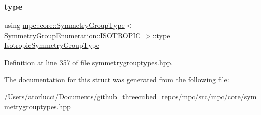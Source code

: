 \subsubsection{\texorpdfstring{type}{type}}
{\footnotesize\ttfamily using \mbox{\hyperlink{structmpc_1_1core_1_1_symmetry_group_type}{mpc\+::core\+::\+Symmetry\+Group\+Type}}$<$ \mbox{\hyperlink{namespacempc_1_1core_a9d979684062547055a0ef5c13077bad8a099d59049574174a1c19567d38b479c2}{Symmetry\+Group\+Enumeration\+::\+I\+S\+O\+T\+R\+O\+P\+IC}} $>$\+::\mbox{\hyperlink{structmpc_1_1core_1_1_symmetry_group_type_3_01_symmetry_group_enumeration_1_1_i_s_o_t_r_o_p_i_c_01_4_a8f392bfab082bbb0e49b422b3601e73a}{type}} =  \mbox{\hyperlink{structmpc_1_1core_1_1_isotropic_symmetry_group_type}{Isotropic\+Symmetry\+Group\+Type}}}



Definition at line 357 of file symmetrygrouptypes.\+hpp.



The documentation for this struct was generated from the following file\+:\begin{DoxyCompactItemize}
\item 
/\+Users/atorlucci/\+Documents/github\+\_\+threecubed\+\_\+repos/mpc/src/mpc/core/\mbox{\hyperlink{symmetrygrouptypes_8hpp}{symmetrygrouptypes.\+hpp}}\end{DoxyCompactItemize}

